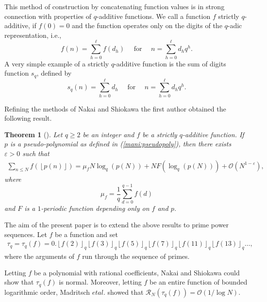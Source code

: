 \documentclass[a4paper,10pt]{amsart}
\numberwithin{equation}{section}
\newtheorem*{thm*}{Theorem}
\theoremstyle{definition}
\theoremstyle{remark}
\newcommand{\lf}{\left\lfloor}
\newcommand{\rf}{\right\rfloor}
\begin{document}
This method of construction by concatenating function values is in strong
connection with properties of $q$-additive functions. We call a function $f$ strictly
$q$-additive, if $f(0)=0$ and the function operates only on the digits of the
$q$-adic representation, i.e.,
\[
  f(n)=\sum_{h=0}^\ell f(d_h)\quad\text{ for }\quad n=\sum_{h=0}^\ell d_hq^h.
\]
A very simple example of a strictly $q$-additive function is the sum of digits
function $s_q$, defined by
\[
  s_q(n)=\sum_{h=0}^\ell d_h\quad\text{ for }\quad n=\sum_{h=0}^\ell d_hq^h.
\]

Refining the methods of Nakai and Shiokawa the first author obtained the following result.
\begin{thm*}[{\cite[Theorem 1.1]{madritsch2012:summatory_function_q}}]
Let $q\geq2$ be an integer and $f$ be a strictly $q$-additive function. If $p$ is a
pseudo-polynomial as defined in (\ref{mani:pseudopoly}), then there exists
$\varepsilon>0$ such that
\begin{gather}\label{mani:mainsum}
  \sum_{n\leq N}f\left(\lf p(n)\rf\right)
  =\mu_fN\log_q(p(N))
  +NF\left(\log_q(p(N))\right)
  +\mathcal{O}\left(N^{1-\varepsilon}\right),
\end{gather}
where
\[
\mu_f=\frac1q\sum_{d=0}^{q-1}f(d)
\]
and $F$ is a $1$-periodic function depending only on $f$ and $p$.
\end{thm*}

The aim of the present paper is to extend the above results to prime power
sequences. Let $f$ be a function and set
\begin{gather}\label{mani:tau}
\tau_q=\tau_q(f)=0.\lf f(2)\rf_q \lf f(3)\rf_q \lf f(5)\rf_q \lf f(7)\rf_q \lf f(11)\rf_q \lf f(13)\rf_q \dots,
\end{gather}
where the arguments of $f$ run through the sequence of primes.

Letting $f$ be a polynomial with rational coefficients, Nakai and Shiokawa
\cite{Nakai_Shiokawa1997:normality_numbers_generated} could show that
$\tau_q(f)$ is normal. Moreover, letting $f$ be an entire function of bounded
logarithmic order, Madritsch $et al.$
\cite{Madritsch_Thuswaldner_Tichy2008:normality_numbers_generated} showed that
$\mathcal{R}_N(\tau_q(f))=\mathcal{O}(1/\log N)$.
\end{document}

